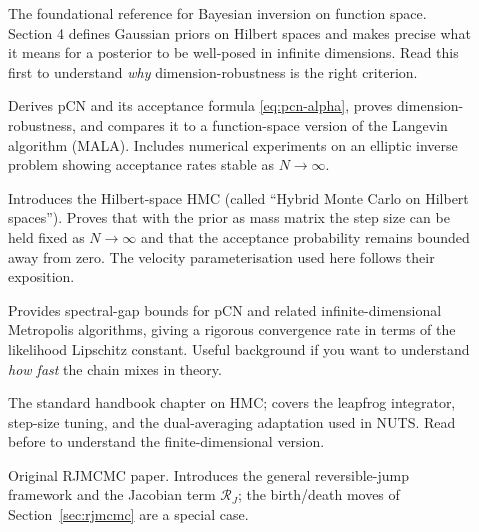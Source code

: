 \documentclass[11pt]{article}
\begin{document}
\begin{description}
  \item[\citet{stuart2010}] The foundational reference for Bayesian inversion on
    function space.  Section 4 defines Gaussian priors on Hilbert spaces and makes
    precise what it means for a posterior to be well-posed in infinite dimensions.
    Read this first to understand \emph{why} dimension-robustness is the right
    criterion.

  \item[\citet{cotter2013}] Derives pCN and its acceptance formula \eqref{eq:pcn-alpha},
    proves dimension-robustness, and compares it to a function-space version of
    the Langevin algorithm (MALA).  Includes numerical experiments on an elliptic
    inverse problem showing acceptance rates stable as $N \to \infty$.

  \item[\citet{beskos2011}] Introduces the Hilbert-space HMC (called ``Hybrid Monte
    Carlo on Hilbert spaces'').  Proves that with the prior as mass matrix the
    step size can be held fixed as $N \to \infty$ and that the acceptance
    probability remains bounded away from zero.  The velocity parameterisation
    used here follows their exposition.

  \item[\citet{hairer2014}] Provides spectral-gap bounds for pCN and related
    infinite-dimensional Metropolis algorithms, giving a rigorous convergence rate
    in terms of the likelihood Lipschitz constant.  Useful background if you want
    to understand \emph{how fast} the chain mixes in theory.

  \item[\citet{neal2011}] The standard handbook chapter on HMC; covers the
    leapfrog integrator, step-size tuning, and the dual-averaging adaptation used
    in NUTS.  Read before \citet{beskos2011} to understand the finite-dimensional
    version.

  \item[\citet{green1995}] Original RJMCMC paper.  Introduces the general
    reversible-jump framework and the Jacobian term $\mathcal{R}_J$; the birth/death
    moves of Section~\ref{sec:rjmcmc} are a special case.
\end{description}



\end{document}
